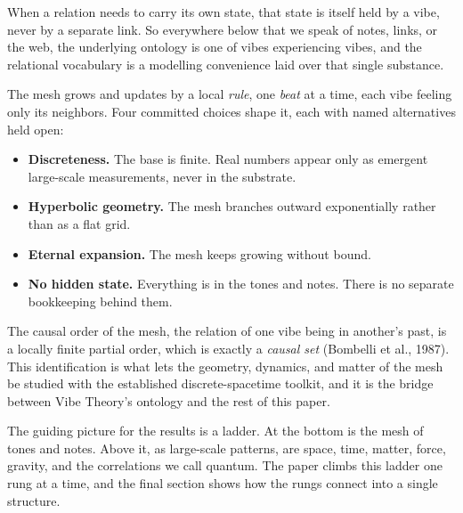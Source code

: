 When a relation needs to carry its own state, that state is itself held by a vibe, never by a separate link. So everywhere below that we speak of notes, links, or the web, the underlying ontology is one of vibes experiencing vibes, and the relational vocabulary is a modelling convenience laid over that single substance.

The mesh grows and updates by a local \emph{rule}, one \emph{beat} at a time, each vibe feeling only its neighbors. Four committed choices shape it, each with named alternatives held open:

\begin{itemize}
\item \textbf{Discreteness.} The base is finite. Real numbers appear only as emergent large-scale measurements, never in the substrate.
\item \textbf{Hyperbolic geometry.} The mesh branches outward exponentially rather than as a flat grid.
\item \textbf{Eternal expansion.} The mesh keeps growing without bound.
\item \textbf{No hidden state.} Everything is in the tones and notes. There is no separate bookkeeping behind them.
\end{itemize}

The causal order of the mesh, the relation of one vibe being in another's past, is a locally finite partial order, which is exactly a \emph{causal set} (Bombelli et al., 1987). This identification is what lets the geometry, dynamics, and matter of the mesh be studied with the established discrete-spacetime toolkit, and it is the bridge between Vibe Theory's ontology and the rest of this paper.

The guiding picture for the results is a ladder. At the bottom is the mesh of tones and notes. Above it, as large-scale patterns, are space, time, matter, force, gravity, and the correlations we call quantum. The paper climbs this ladder one rung at a time, and the final section shows how the rungs connect into a single structure.
